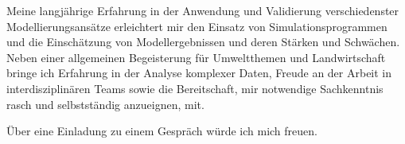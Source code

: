 \documentclass[11pt,a4paper,sans]{moderncv}        %
\begin{document}
Meine langj\"ahrige Erfahrung in der Anwendung und Validierung verschiedenster Modellierungsans\"atze erleichtert mir den Einsatz von Simulationsprogrammen und die Einsch\"atzung von Modellergebnissen und deren St\"arken und Schw\"achen. Neben einer allgemeinen Begeisterung f\"ur  Umweltthemen und Landwirtschaft bringe ich Erfahrung in der Analyse komplexer Daten, Freude an der Arbeit in interdisziplin\"aren Teams sowie  die Bereitschaft, mir notwendige Sachkenntnis rasch und selbstst\"andig anzueignen, mit.%

\"Uber eine Einladung zu einem Gespr\"ach w\"urde ich mich freuen.

\makeletterclosing
\clearpage


\nocite{*}

   
%
%
%
%
%
%
%
\end{document}
